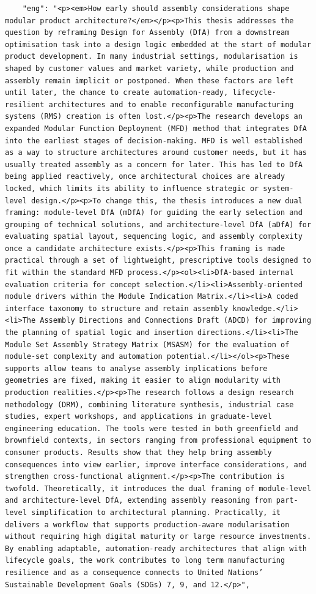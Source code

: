 \begin{casestudySection}
\begin{lstlisting}
    "eng": "<p><em>How early should assembly considerations shape modular product architecture?</em></p><p>This thesis addresses the question by reframing Design for Assembly (DfA) from a downstream optimisation task into a design logic embedded at the start of modular product development. In many industrial settings, modularisation is shaped by customer values and market variety, while production and assembly remain implicit or postponed. When these factors are left until later, the chance to create automation-ready, lifecycle-resilient architectures and to enable reconfigurable manufacturing systems (RMS) creation is often lost.</p><p>The research develops an expanded Modular Function Deployment (MFD) method that integrates DfA into the earliest stages of decision-making. MFD is well established as a way to structure architectures around customer needs, but it has usually treated assembly as a concern for later. This has led to DfA being applied reactively, once architectural choices are already locked, which limits its ability to influence strategic or system-level design.</p><p>To change this, the thesis introduces a new dual framing: module-level DfA (mDfA) for guiding the early selection and grouping of technical solutions, and architecture-level DfA (aDfA) for evaluating spatial layout, sequencing logic, and assembly complexity once a candidate architecture exists.</p><p>This framing is made practical through a set of lightweight, prescriptive tools designed to fit within the standard MFD process.</p><ol><li>DfA-based internal evaluation criteria for concept selection.</li><li>Assembly-oriented module drivers within the Module Indication Matrix.</li><li>A coded interface taxonomy to structure and retain assembly knowledge.</li><li>The Assembly Directions and Connections Draft (ADCD) for improving the planning of spatial logic and insertion directions.</li><li>The Module Set Assembly Strategy Matrix (MSASM) for the evaluation of module-set complexity and automation potential.</li></ol><p>These supports allow teams to analyse assembly implications before geometries are fixed, making it easier to align modularity with production realities.</p><p>The research follows a design research methodology (DRM), combining literature synthesis, industrial case studies, expert workshops, and applications in graduate-level engineering education. The tools were tested in both greenfield and brownfield contexts, in sectors ranging from professional equipment to consumer products. Results show that they help bring assembly consequences into view earlier, improve interface considerations, and strengthen cross-functional alignment.</p><p>The contribution is twofold. Theoretically, it introduces the dual framing of module-level and architecture-level DfA, extending assembly reasoning from part-level simplification to architectural planning. Practically, it delivers a workflow that supports production-aware modularisation without requiring high digital maturity or large resource investments. By enabling adaptable, automation-ready architectures that align with lifecycle goals, the work contributes to long term manufacturing resilience and as a consequence connects to United Nations’ Sustainable Development Goals (SDGs) 7, 9, and 12.</p>",

\end{lstlisting}
\end{casestudySection}
